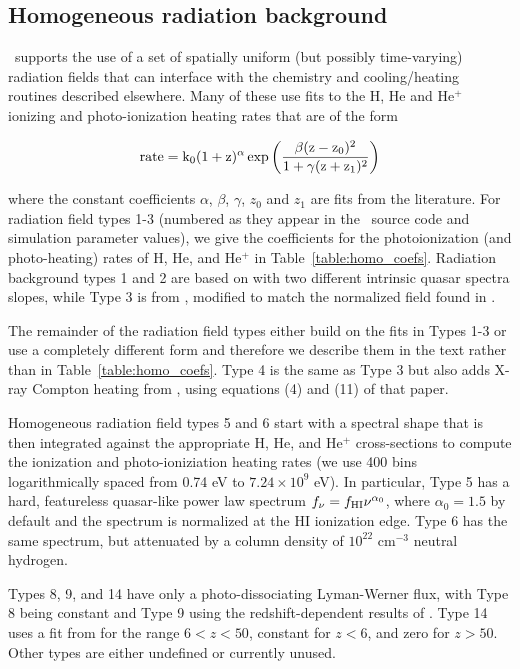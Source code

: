 \subsection{Homogeneous radiation background}
\label{sec.num.rad-homogeneous}

\enzo\ supports the use of a set of spatially uniform (but possibly
time-varying) radiation fields that can interface with the chemistry
and cooling/heating routines described elsewhere.  Many of these use
fits to the H, He and He$^+$ ionizing and photo-ionization heating
rates that are of the form

\begin{equation}
\rm{rate} = k_0  (1+z)^{\alpha}  \exp{\left( \frac{\beta (z-z_0)^2 }{1 + \gamma  (z+z_1)^2} \right)}
\label{eq:homo_rad_template}
\end{equation}

where the constant coefficients $\alpha$, $\beta$, $\gamma$, $z_0$ and
$z_1$ are fits from the literature.  For radiation field types 1-3
(numbered as they appear in the \enzo\ source code and simulation
parameter values), we
give the coefficients for the photoionization (and photo-heating)
rates of H, He, and He$^+$ in Table~\ref{table:homo_coefs}.  Radiation
background types 1
and 2 are based on \citet{1996ApJ...461...20H} with two different
intrinsic quasar spectra slopes, while Type 3 is from
\citet{2012ApJ...746..125H}, modified to match the normalized field
found in \citet{Kirkman05}.  

The remainder of the radiation field types either build on the fits in Types
1-3 or use a completely different form and therefore we describe them
in the text rather than in Table~\ref{table:homo_coefs}.
Type 4 is the same as Type 3 but also
adds X-ray Compton heating from \citet{MadauEfstathiou99}, using
equations (4) and (11) of that paper.

Homogeneous radiation field types 5 and 6 start with a spectral shape
that is then integrated against the appropriate H, He, and He$^+$
cross-sections to compute the ionization and photo-ioniziation heating
rates (we use 400 bins logarithmically spaced from 0.74 eV to $7.24
\times 10^9$ eV).  In particular, Type 5 has a hard, featureless
quasar-like power law spectrum $f_{\nu} = f_{\rm HI} \nu^{\alpha_0}$,
where $\alpha_0 = 1.5$ by default and the spectrum is normalized at
the HI ionization edge.  Type 6 has the same spectrum, but attenuated
by a column density of $10^{22}$ cm$^{-3}$ neutral hydrogen.  

Types 8, 9, and 14 have only a photo-dissociating Lyman-Werner flux,
with Type 8 being constant and Type 9 using the redshift-dependent
results of \citet{TrentiStiavelli09}.  Type 14 uses a fit from
\citet{WiseAbel05} for the range $6 < z < 50$, constant for $z<6$, and
zero for $z > 50$.  Other types are either undefined or currently unused.


